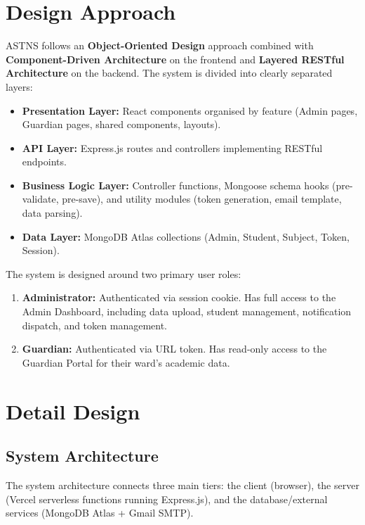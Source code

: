 \documentclass[12pt,a4paper]{report}
\begin{document}
\section{Design Approach}
ASTNS follows an \textbf{Object-Oriented Design} approach combined with \textbf{Component-Driven Architecture} on the frontend and \textbf{Layered RESTful Architecture} on the backend. The system is divided into clearly separated layers:

\begin{itemize}
  \item \textbf{Presentation Layer:} React components organised by feature (Admin pages, Guardian pages, shared components, layouts).
  \item \textbf{API Layer:} Express.js routes and controllers implementing RESTful endpoints.
  \item \textbf{Business Logic Layer:} Controller functions, Mongoose schema hooks (pre-validate, pre-save), and utility modules (token generation, email template, data parsing).
  \item \textbf{Data Layer:} MongoDB Atlas collections (Admin, Student, Subject, Token, Session).
\end{itemize}

The system is designed around two primary user roles:
\begin{enumerate}
  \item \textbf{Administrator:} Authenticated via session cookie. Has full access to the Admin Dashboard, including data upload, student management, notification dispatch, and token management.
  \item \textbf{Guardian:} Authenticated via URL token. Has read-only access to the Guardian Portal for their ward's academic data.
\end{enumerate}

\section{Detail Design}

\subsection{System Architecture}

The system architecture connects three main tiers: the client (browser), the server (Vercel serverless functions running Express.js), and the database/external services (MongoDB Atlas + Gmail SMTP).
\end{document}

